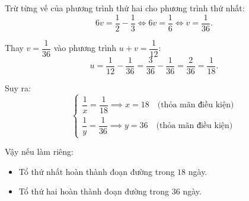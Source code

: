 \begin{ex}[1,5 điểm]
{Trừ từng vế của phương trình thứ hai cho phương trình thứ nhất:
$$6v = \dfrac{1}{2} - \dfrac{1}{3} \iff 6v = \dfrac{1}{6} \iff v = \dfrac{1}{36}.$$

Thay $v = \dfrac{1}{36}$ vào phương trình $u + v = \dfrac{1}{12}$:
$$u = \dfrac{1}{12} - \dfrac{1}{36} = \dfrac{3}{36} - \dfrac{1}{36} = \dfrac{2}{36} = \dfrac{1}{18}.$$

Suy ra:
$$\begin{cases} \dfrac{1}{x} = \dfrac{1}{18} \implies x = 18 \quad \text{(thỏa mãn điều kiện)} \\[8pt] \dfrac{1}{y} = \dfrac{1}{36} \implies y = 36 \quad \text{(thỏa mãn điều kiện)} \end{cases}$$

Vậy nếu làm riêng:
\begin{itemize}
	\item Tổ thứ nhất hoàn thành đoạn đường trong $18$ ngày.
	\item Tổ thứ hai hoàn thành đoạn đường trong $36$ ngày.
\end{itemize}
}
\end{ex}
